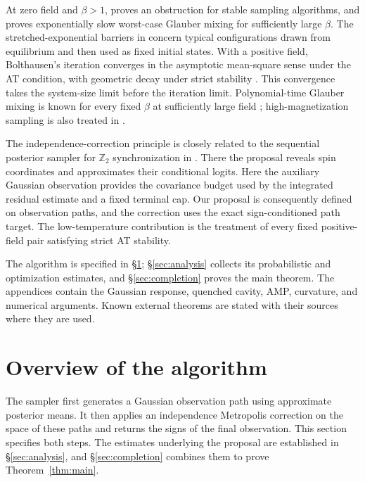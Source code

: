 \documentclass[11pt,reqno]{amsart}
\begin{document}
At zero field and $\beta>1$, \cite{el2022sampling} proves an obstruction for stable sampling algorithms, and \cite{sellke2025exponentially} proves exponentially slow worst-case Glauber mixing for sufficiently large $\beta$. The stretched-exponential barriers in \cite{openai2026barriers} concern typical configurations drawn from equilibrium and then used as fixed initial states. With a positive field, Bolthausen's iteration converges in the asymptotic mean-square sense under the AT condition, with geometric decay under strict stability \cite[Theorem~2.1]{bolthausen2014iterative}. This convergence takes the system-size limit before the iteration limit. Polynomial-time Glauber mixing is known for every fixed $\beta$ at sufficiently large field \cite[Corollary~1.2]{bandeira2026mixing}; high-magnetization sampling is also treated in \cite{kumar2026high}.

The independence-correction principle is closely related to the sequential posterior sampler for $\mathbb Z_2$ synchronization in \cite{li2026efficient}. There the proposal reveals spin coordinates and approximates their conditional logits. Here the auxiliary Gaussian observation provides the covariance budget used by the integrated residual estimate and a fixed terminal cap. Our proposal is consequently defined on observation paths, and the correction uses the exact sign-conditioned path target. The low-temperature contribution is the treatment of every fixed positive-field pair satisfying strict AT stability.

The algorithm is specified in \S\ref{sec:algorithm}; \S\ref{sec:analysis} collects its probabilistic and optimization estimates, and \S\ref{sec:completion} proves the main theorem. The appendices contain the Gaussian response, quenched cavity, AMP, curvature, and numerical arguments. Known external theorems are stated with their sources where they are used.


\section{Overview of the algorithm}\label{sec:algorithm}

The sampler first generates a Gaussian observation path using approximate
posterior means. It then applies an independence Metropolis correction on
the space of these paths and returns the signs of the final observation.
This section specifies both steps. The estimates underlying the proposal
are established in \S\ref{sec:analysis}, and \S\ref{sec:completion}
combines them to prove Theorem~\ref{thm:main}.
\end{document}
